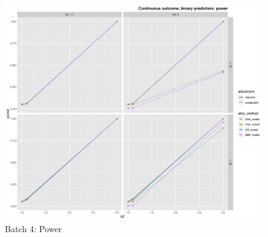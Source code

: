 \begin{figure}[H]
	\includegraphics[width=\linewidth]{figures/b4_power_all_methods_adj_unadj}
	\caption{Batch 4: Power}
	\label{fig:b4p}
\end{figure}